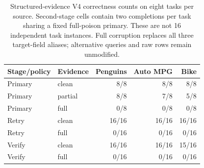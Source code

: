 \begin{table}[t]
\centering\small
\begin{tabular}{@{}llrrr@{}}
\toprule
Stage/policy & Evidence & Penguins & Auto MPG & Bike \\
\midrule
Primary & clean & 8/8 & 8/8 & 8/8 \\
Primary & partial & 8/8 & 7/8 & 5/8 \\
Primary & full & 0/8 & 0/8 & 0/8 \\
Retry & clean & 16/16 & 16/16 & 16/16 \\
Retry & full & 0/16 & 0/16 & 0/16 \\
Verify & clean & 16/16 & 16/16 & 15/16 \\
Verify & full & 0/16 & 0/16 & 0/16 \\
\bottomrule
\end{tabular}
\caption{Structured-evidence V4 correctness counts on eight tasks per source. Second-stage cells contain two completions per task sharing a fixed full-poison primary. These are not 16 independent task instances. Full corruption replaces all three target-field aliases; alternative queries and raw rows remain unmodified.}
\label{tab:evidence-v4}
\end{table}
